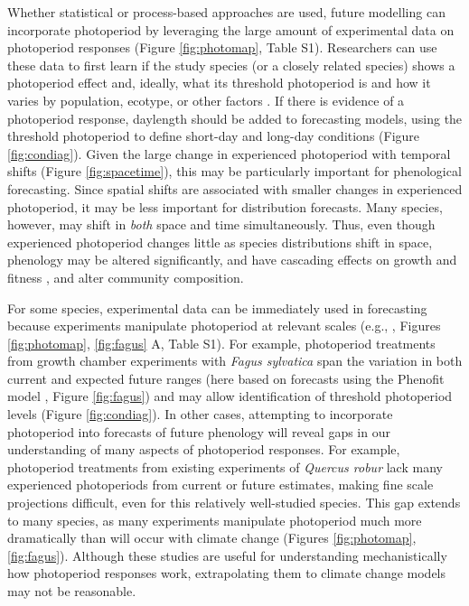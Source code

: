 \documentclass{article}
\begin{document}
\par Whether statistical or process-based approaches are used, future modelling can incorporate photoperiod by leveraging the large amount of experimental data on photoperiod responses (Figure \ref{fig:photomap}, Table S1). Researchers can use these data to first learn if the study species (or a closely related species) shows a photoperiod effect and, ideally, what its threshold photoperiod is and how it varies by population, ecotype, or other factors \citep{bradshaw2006,gwinner1996,tobin2008}. If there is evidence of a photoperiod response, daylength should be added to forecasting models, using the threshold photoperiod to define short-day and long-day conditions (Figure \ref{fig:condiag}). Given the large change in experienced photoperiod with temporal shifts (Figure \ref{fig:spacetime}), this may be particularly important for phenological forecasting. Since spatial shifts are associated with smaller changes in experienced photoperiod, it may be less important for distribution forecasts. Many species, however, may shift in \emph{both} space and time simultaneously. Thus, even though experienced photoperiod changes little as species distributions shift in space, phenology may be altered significantly, and have cascading effects on growth and fitness \citep{duputie2015}, and alter community  composition.

\par For some species, experimental data can be immediately used in forecasting because experiments manipulate photoperiod at relevant scales (e.g., \citet{Basler:2014aa,Heide:2015aa}, Figures \ref{fig:photomap}, \ref{fig:fagus} A, Table S1).  For example, photoperiod treatments from growth chamber experiments with \emph{Fagus sylvatica} span the variation in both current and expected future ranges (here based on forecasts using the Phenofit model \citep{duputie2015}, Figure \ref{fig:fagus}) and may allow identification of threshold photoperiod levels (Figure \ref{fig:condiag}). In other cases, attempting to incorporate photoperiod into forecasts of future phenology will reveal gaps in our understanding of many aspects of photoperiod responses. For example, photoperiod treatments from existing experiments of \emph{Quercus robur} lack many experienced photoperiods from current or future estimates, making fine scale projections difficult, even for this relatively well-studied species. This gap extends to many species, as many experiments manipulate photoperiod much more dramatically than will occur with climate change (Figures \ref{fig:photomap}, \ref{fig:fagus}). Although these studies are useful for understanding mechanistically how photoperiod responses work, extrapolating them to climate change models may not be reasonable.
\end{document}
